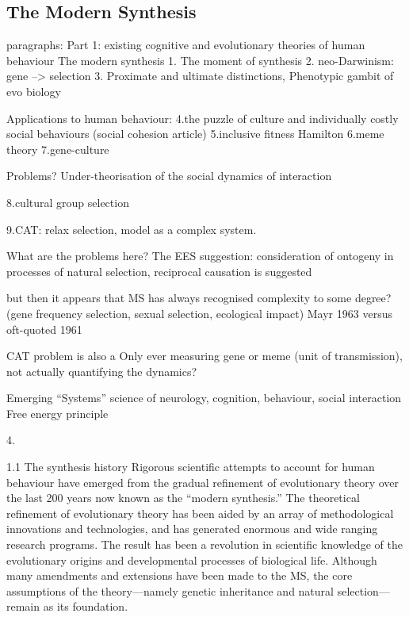 \subsection{The Modern Synthesis}

paragraphs:
Part 1: existing cognitive and evolutionary theories of human behaviour
The modern synthesis
    1. The moment of synthesis
    2. neo-Darwinism: gene --> selection
    3. Proximate and ultimate distinctions, Phenotypic gambit of evo biology

Applications to human behaviour:
    4.the puzzle of culture and individually costly social behaviours (social cohesion article)
    5.inclusive fitness Hamilton
    6.meme theory
    7.gene-culture

Problems?
Under-theorisation of the social dynamics of interaction

    8.cultural group selection

    9.CAT: relax selection, model as a complex system.

What are the problems here?
  The EES suggestion: consideration of ontogeny in processes of natural selection, reciprocal causation is suggested

  but then it appears that MS has always recognised complexity to some degree?
   (gene frequency selection, sexual selection, ecological impact)
   Mayr 1963 versus oft-quoted 1961


  CAT problem is also a Only ever measuring gene or meme (unit of transmission), not actually quantifying the dynamics?

Emerging ``Systems'' science of neurology, cognition, behaviour, social interaction
Free energy principle


4.


1.1 The synthesis history
Rigorous scientific attempts to account for human behaviour have emerged from the gradual refinement of evolutionary theory over the last 200 years now known as the ``modern synthesis.''  The theoretical refinement of evolutionary theory has been aided by an array of methodological innovations and technologies, and has generated enormous and wide ranging research programs. The result has been a revolution in scientific knowledge of the evolutionary origins and developmental processes of biological life.  Although many amendments and extensions have been made to the MS, the core assumptions of the theory---namely genetic inheritance and natural selection---remain as its foundation.



